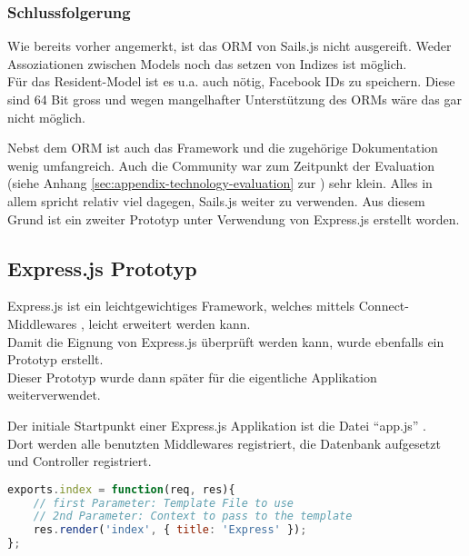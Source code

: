 \subsubsection*{Schlussfolgerung}

Wie bereits vorher angemerkt, ist das ORM von Sails.js nicht ausgereift. Weder Assoziationen zwischen Models \cite{SailsjsModelAssociations} noch das setzen von Indizes ist möglich.\\
Für das Resident-Model ist es u.a. auch nötig, Facebook IDs zu speichern. Diese sind 64 Bit gross und wegen mangelhafter Unterstützung des ORMs wäre das gar nicht möglich.

Nebst dem ORM ist auch das Framework und die zugehörige Dokumentation wenig umfangreich. Auch die Community war zum Zeitpunkt der Evaluation (siehe Anhang \ref{sec:appendix-technology-evaluation} zur ) sehr klein.
Alles in allem spricht relativ viel dagegen, Sails.js weiter zu verwenden. Aus diesem Grund ist ein zweiter Prototyp unter Verwendung von Express.js erstellt worden.

\subsection{Express.js Prototyp}

Express.js \cite{Expressjs} ist ein leichtgewichtiges Framework, welches mittels Connect-Middlewares \cite{connect}, leicht erweitert werden kann.\\[1mm]
Damit die Eignung von Express.js überprüft werden kann, wurde ebenfalls ein Prototyp \cite{ExpressjsPrototyp} erstellt.\\
Dieser Prototyp wurde dann später für die eigentliche Applikation weiterverwendet.

Der initiale Startpunkt einer Express.js Applikation ist die Datei ``app.js'' \cite{ExpressjsPrototypAppjs}.\\
Dort werden alle benutzten Middlewares registriert, die Datenbank aufgesetzt und Controller registriert.\\[0.5mm]

\begin{lstlisting}[language=JavaScript, caption=Beispiel eines Controllers in Express.js, label=lst:controllerInExpressjs]
exports.index = function(req, res){
	// first Parameter: Template File to use
	// 2nd Parameter: Context to pass to the template
	res.render('index', { title: 'Express' });
};
\end{lstlisting}


